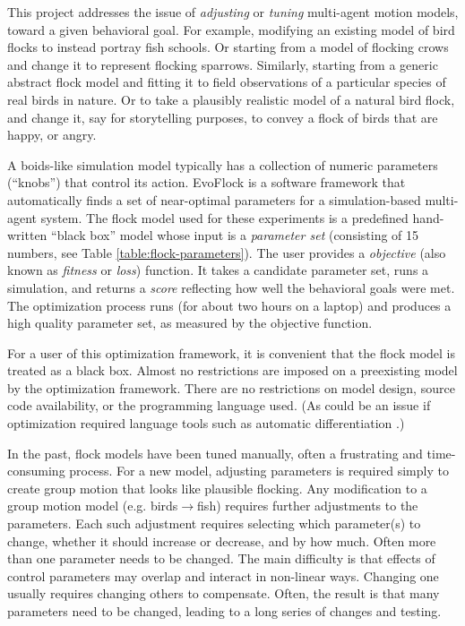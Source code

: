 \documentclass[letterpaper]{article}
\begin{document}
This project addresses the issue of \textit{adjusting} or \textit{tuning} multi-agent motion models, toward a given behavioral goal. For example, modifying an existing model of bird flocks to instead portray fish schools. Or starting from a model of flocking crows and change it to represent flocking sparrows. Similarly, starting from a generic abstract flock model and fitting it to field observations of a particular species of real birds in nature. Or to take a plausibly realistic model of a natural bird flock, and change it, say for storytelling purposes, to convey a flock of birds that are happy, or angry. 

A boids-like simulation model typically has a collection of numeric parameters (``knobs'') that control its action. EvoFlock is a software framework that automatically finds a set of near-optimal parameters for a simulation-based multi-agent system. The flock model used for these experiments is a predefined hand-written ``black box'' model whose input is a \textit{parameter set} (consisting of 15 numbers, see Table \ref{table:flock-parameters}). The user provides a \textit{objective} (also known as \textit{fitness} or \textit{loss}) function. It takes a candidate parameter set, runs a simulation, and returns a \textit{score} reflecting how well the behavioral goals were met. The optimization process runs (for about two hours on a laptop) and produces a high quality parameter set, as measured by the objective function.

For a user of this optimization framework, it is convenient that the flock model is treated as a black box. Almost no restrictions are imposed on a preexisting model by the optimization framework. There are no restrictions on model design, source code availability, or the programming language used. (As could be an issue if optimization required language tools such as automatic differentiation \citep{baydin_automatic_2018}.)

In the past, flock models have been tuned manually, often a frustrating and time-consuming process. For a new model, adjusting parameters is required simply to create group motion that looks like plausible flocking. Any modification to a group motion model (e.g. birds{$\rightarrow$}fish) requires further adjustments to the parameters. Each such adjustment requires selecting which parameter(s) to change, whether it should increase or decrease, and by how much. Often more than one parameter needs to be changed. The main difficulty is that effects of control parameters may overlap and interact in non-linear ways. Changing one usually requires changing others to compensate. Often, the result is that many parameters need to be changed, leading to a long series of changes and testing.
\end{document}
